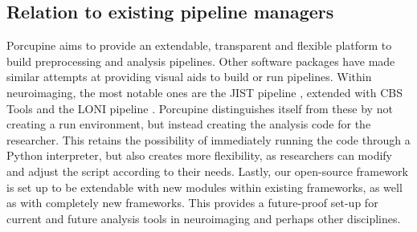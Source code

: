 \subsection{Relation to existing pipeline managers}
Porcupine aims to provide an extendable, transparent and flexible platform to build preprocessing and analysis pipelines. Other software packages have made similar attempts at providing visual aids to build or run pipelines. Within neuroimaging, the most notable ones are the JIST pipeline \cite{Lucas2010}, extended with CBS Tools \cite{Bazin2014} and the LONI pipeline \cite{Rex2003}. Porcupine distinguishes itself from these by not creating a run environment, but instead creating the analysis code for the researcher. This retains the possibility of immediately running the code through a Python interpreter, but also creates more flexibility, as researchers can modify and adjust the script according to their needs. Lastly, our open-source framework is set up to be extendable with new modules within existing frameworks, as well as with completely new frameworks. This provides a future-proof set-up for current and future analysis tools in neuroimaging and perhaps other disciplines.
